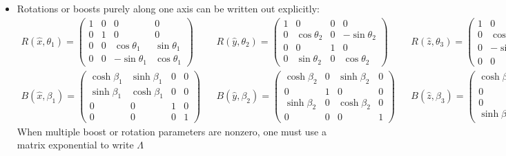 \documentclass[12pt]{article}
\theoremstyle{mytheorem}
\begin{document}
\begin{itemize}
	\item Rotations or boosts purely along one axis can be written out explicitly:
	\tiny
	\begin{align}
		R(\hat x, \theta_1) = \begin{pmatrix} 1 & 0 & 0 & 0 \\ 0 & 1 & 0 & 0 \\ 0 & 0 & \cos\theta_1 & \sin\theta_1 \\ 0 & 0 & -\sin\theta_1 & \cos\theta_1 \end{pmatrix} 
		&&
		R(\hat y, \theta_2) = \begin{pmatrix} 1 & 0 & 0 & 0 \\ 0 & \cos\theta_2 & 0 & -\sin\theta_2 \\ 0 & 0 & 1 & 0 \\ 0 & \sin\theta_2 & 0 & \cos\theta_2 \end{pmatrix} 
		&&
		R(\hat z, \theta_3) = \begin{pmatrix} 1 & 0 & 0 & 0 \\ 0 & \cos\theta_3 & \sin\theta_3 & 0 \\ 0 & -\sin\theta_3 & \cos\theta_3 & 0 \\ 0 & 0 & 0 & 1 \end{pmatrix}
		\\
		B(\hat x, \beta_1) = \begin{pmatrix} \cosh\beta_1 & \sinh\beta_1 & 0 & 0 \\ \sinh\beta_1 & \cosh\beta_1 & 0 & 0 \\ 0 & 0 & 1 & 0 \\ 0 & 0 & 0 & 1 \end{pmatrix} 
		&&
		B(\hat y, \beta_2) = \begin{pmatrix} \cosh\beta_2 & 0 & \sinh\beta_2 & 0 \\ 0 & 1 & 0 & 0 \\ \sinh\beta_2 & 0 & \cosh\beta_2 & 0 \\ 0 & 0 & 0 & 1 \end{pmatrix} 
		&& 
		B(\hat z, \beta_3) = \begin{pmatrix} \cosh\beta_3 & 0 & 0 & \sinh\beta_3 \\ 0 & 1 & 0 & 0 \\ 0 & 0 & 1 & 0 \\ \sinh\beta_3 & 0 & 0 & \cosh\beta_3 \end{pmatrix} 
	\end{align}
	\normalsize
	When multiple boost or rotation parameters are nonzero, one must use a matrix exponential to write $\Lambda$ 

\end{itemize}
\end{document}
